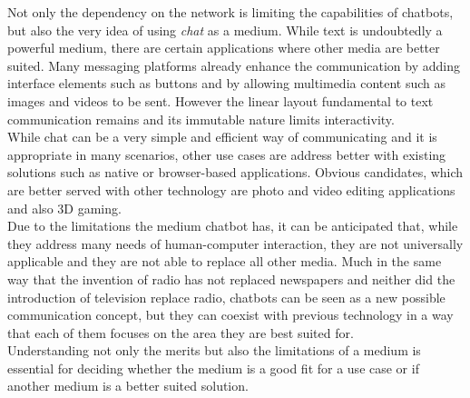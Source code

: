 Not only the dependency on the network is limiting the capabilities of chatbots,
but also the very idea of using \emph{chat} as a medium.
While text is undoubtedly a powerful medium,
there are certain applications where other media are better suited.
Many messaging platforms already enhance the communication by adding interface elements such as buttons
and by allowing multimedia content such as images and videos to be sent.
However the linear layout fundamental to text communication remains and its immutable nature limits interactivity.
\\
While chat can be a very simple and efficient way of communicating and it is appropriate in many scenarios,
other use cases are address better with existing solutions such as native or browser-based applications.
Obvious candidates, which are better served with other technology are photo and video editing applications
and also 3D gaming.
\\

Due to the limitations the medium chatbot has, it can be anticipated
that, while they address many needs of human-computer interaction,
they are not universally applicable and they are not able to replace all other media.
Much in the same way that the invention of radio has not replaced newspapers
and neither did the introduction of television replace radio,
chatbots can be seen as a new possible communication concept,
but they can coexist with previous technology in a way that each of them focuses on the area they are best suited for.
\\
Understanding not only the merits but also the limitations of a medium is essential for deciding
whether the medium is a good fit for a use case or if another medium is a better suited solution.
\\

